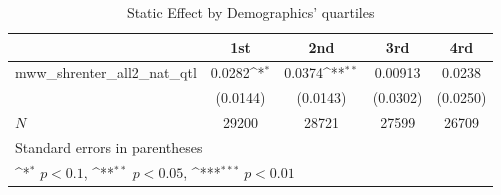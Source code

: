 \begin{table}[htbp]\centering
\def\sym#1{\ifmmode^{#1}\else\(^{#1}\)\fi}
\caption{Static Effect by Demographics' quartiles}
\begin{tabular}{l*{4}{c}}
\hline\hline
            &\multicolumn{1}{c}{1st}&\multicolumn{1}{c}{2nd}&\multicolumn{1}{c}{3rd}&\multicolumn{1}{c}{4rd}\\
\hline
mww\_shrenter\_all2\_nat\_qtl&      0.0282\sym{*}  &      0.0374\sym{**} &     0.00913         &      0.0238         \\
            &    (0.0144)         &    (0.0143)         &    (0.0302)         &    (0.0250)         \\
\hline
\(N\)       &       29200         &       28721         &       27599         &       26709         \\
\hline\hline
\multicolumn{5}{l}{\footnotesize Standard errors in parentheses}\\
\multicolumn{5}{l}{\footnotesize \sym{*} \(p<0.1\), \sym{**} \(p<0.05\), \sym{***} \(p<0.01\)}\\
\end{tabular}
\end{table}
